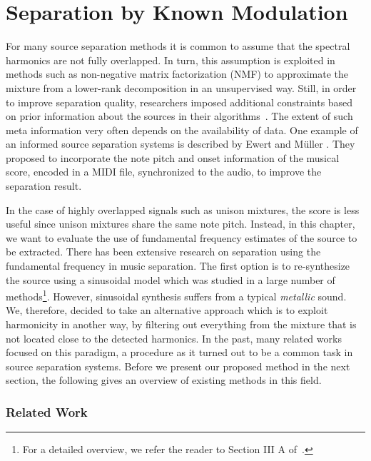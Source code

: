 \chapter{Separation by Known Modulation}
\label{cha:known}

For many source separation methods it is common to assume that the spectral harmonics are not fully overlapped.
In turn, this assumption is exploited in methods such as non-negative matrix factorization (NMF) to approximate the mixture from a lower-rank decomposition in an unsupervised way.
Still, in order to improve separation quality, researchers imposed additional constraints based on prior information about the sources in their algorithms~\cite{ozerov12}.
The extent of such meta information very often depends on 
the availability of data.
One example of an informed source separation systems is described by Ewert and M\"uller \cite{ewert12}.
They proposed to incorporate the note pitch and onset information of the musical score, encoded in a MIDI file, synchronized to the audio, to improve the separation result.
\par
In the case of highly overlapped signals such as unison mixtures, the score is less useful since unison mixtures share the same note pitch.
Instead, in this chapter, we want to evaluate the use of fundamental frequency estimates of the source to be extracted.
There has been extensive research on separation using the fundamental frequency in music separation.
The first option is to re-synthesize the source using a sinusoidal model which was studied in a large number of methods\footnote{For a detailed overview, we refer the reader to Section III A of~\cite{rafii}.}.
However, sinusoidal synthesis suffers from a typical \textit{metallic} sound. 
We, therefore, decided to take an alternative approach which is to exploit harmonicity in another way, by filtering out everything from the mixture that is not located close to the detected harmonics.
In the past, many related works focused on this paradigm, a procedure as it turned out to be a common task in source separation systems. 
Before we present our proposed method in the next section, the following gives an overview of existing methods in this field.

\subsection*{Related Work}


